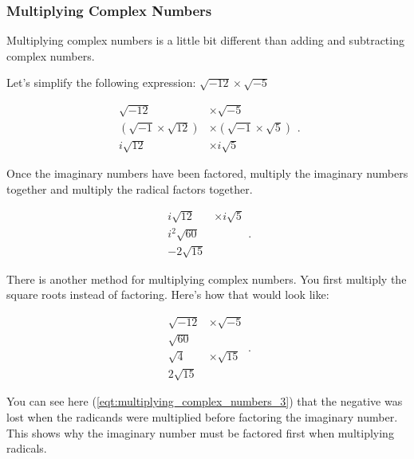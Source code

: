 
\subsubsection{Multiplying Complex Numbers}
\label{sub_sub_sec:multiplying_complex_numbers}

Multiplying complex numbers is a little bit different than adding and
subtracting complex numbers.

\begin{example}
  \label{exm:multiplying_complex_numbers}
  Let's simplify the following expression: $\sqrt{-12} \times \sqrt{-5}$

  \begin{equation}
    \label{eqt:multiplying_complex_numbers_1}
    \begin{split}
      \sqrt{-12} &\times \sqrt{-5} \\
      (\sqrt{-1} \times \sqrt{12}) &\times (\sqrt{-1} \times \sqrt{5}) \\
      i\sqrt{12} &\times i\sqrt{5}
    \end{split}
  .\end{equation}

  Once the imaginary numbers have been factored, multiply the imaginary numbers
  together and multiply the radical factors together.

  \begin{equation}
    \label{eqt:multiplying_complex_numbers_2}
    \begin{split}
      i\sqrt{12} &\times i\sqrt{5} \\
      i^{2}\sqrt{60} \\
      -2\sqrt{15}
    \end{split}
  .\end{equation}

  There is another method for multiplying complex numbers. You first multiply
  the square roots instead of factoring. Here's how that would look like:

  \begin{equation}
    \label{eqt:multiplying_complex_numbers_3}
    \begin{split}
      \sqrt{-12} &\times \sqrt{-5} \\
      \sqrt{60} \\
      \sqrt{4} &\times \sqrt{15} \\
      2\sqrt{15}
    \end{split}
  .\end{equation}

  You can see here (\ref{eqt:multiplying_complex_numbers_3}) that the negative
  was lost when the radicands were multiplied before factoring the imaginary
  number. This shows why the imaginary number must be factored first when
  multiplying radicals.
\end{example}


\newpage
